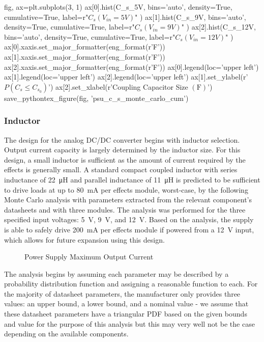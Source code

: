 \documentclass[12pt, titlepage]{/home/air/projects/latex-template/tex-template}
\begin{document}
\begin{pycode}
fig, ax=plt.subplots(3, 1)
ax[0].hist(C_s_5V, bins='auto', density=True, cumulative=True,
           label=r"$C_{s}(V_{in}=5V)$"
           )
ax[1].hist(C_s_9V, bins='auto', density=True, cumulative=True,
           label=r"$C_{s}(V_{in}=9V)$"
           )
ax[2].hist(C_s_12V, bins='auto', density=True, cumulative=True,
           label=r"$C_{s}(V_{in}=12V)$"
           )
ax[0].xaxis.set_major_formatter(eng_format(r'\unit{\farad}'))
ax[1].xaxis.set_major_formatter(eng_format(r'\unit{\farad}'))
ax[2].xaxis.set_major_formatter(eng_format(r'\unit{\farad}'))
ax[0].legend(loc='upper left')
ax[1].legend(loc='upper left')
ax[2].legend(loc='upper left')
ax[1].set_ylabel(r'$P\left(C_s \leq C_{s_0}\right)$')
ax[2].set_xlabel(r'Coupling Capacitor Size $\left(\unit{\farad}\right)$')
save_pythontex_figure(fig, 'psu_c_s_monte_carlo_cum')

\end{pycode}

\subsubsection{Inductor}
The design for the analog DC/DC converter begins with inductor selection. Output current capacity is largely determined by the inductor size. For this design, a small inductor is sufficient as the amount of current required by the effects is generally small. A standard compact coupled inductor with series inductance of \SI{22}{\micro\henry} and parallel inductance of \SI{11}{\micro\henry} is predicted to be sufficient to drive loads at up to \SI{80}{\milli\ampere} per effects module, worst-case, by the following Monte Carlo analysis with parameters extracted from the relevant component's datasheets and with three modules. The analysis was performed for the three specified input voltages: \SI{5}{\volt}, \SI{9}{\volt}, and \SI{12}{\volt}. Based on the analysis, the supply is able to safely drive \SI{200}{\milli\ampere} per effects module if powered from a \SI{12}{\volt} input, which allows for future expansion using this design.

\begin{figure}[!ht]
    \centering
    
    
    \caption{Power Supply Maximum Output Current}
\end{figure}

The analysis begins by assuming each parameter may be described by a probability distribution function and assigning a reasonable function to each. For the majority of datasheet parameters, the manufacturer only provides three values: an upper bound, a lower bound, and a nominal value - we assume that these datasheet parameters have a triangular PDF based on the given bounds and value for the purpose of this analysis but this may very well not be the case depending on the available components.
\end{document}
